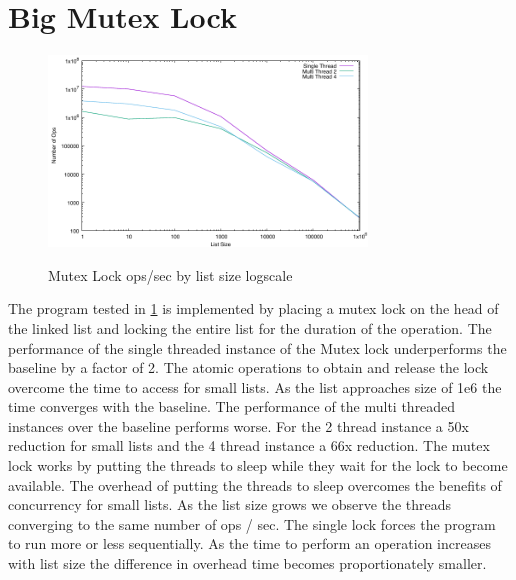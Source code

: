 \documentclass{article}
\begin{document}
\section{Big Mutex Lock}
	\begin{figure}[h]
		\centering
		\includegraphics[height=2in]{outputData/bfl_mutex.pdf}
		\label{f:Fig.2}
		\caption{Mutex Lock ops/sec by list size logscale}
	\end{figure}
The program tested in \ref{f:Fig.2} is implemented by placing a mutex lock on the head of 
the linked list and locking the entire list for the duration of the operation. 
\newline
\newline
The performance of the single threaded instance of the Mutex lock underperforms the 
baseline by a factor of 2. The atomic operations to obtain and release the lock overcome 
the time to access for small lists. As the list approaches size of 1e6 the time converges 
with the baseline. 
\newline
\newline
The performance of the multi threaded instances over the baseline performs worse. For 
the 2 thread instance a 50x reduction for small lists and the 4 thread instance a 66x 
reduction. The mutex lock works by putting the threads to sleep while they wait for the 
lock to become available. The overhead of putting the threads to sleep overcomes the 
benefits of concurrency for small lists. As the list size grows we observe the threads
converging to the same number of ops / sec. The single lock forces the program to run 
more or less sequentially. As the time to perform an operation increases with list size 
the difference in overhead time becomes proportionately smaller. 
\end{document}
